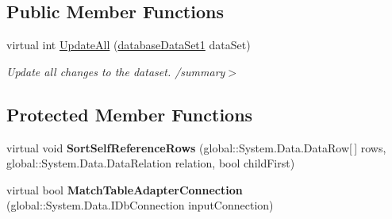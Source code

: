 \subsection*{Public Member Functions}
\begin{DoxyCompactItemize}
\item 
\mbox{\label{classprojekt__grupowy_1_1database_data_set1_table_adapters_1_1_table_adapter_manager_a38426ebb65e6233c6fd1842095acb234}} 
virtual int \hyperlink{classprojekt__grupowy_1_1database_data_set1_table_adapters_1_1_table_adapter_manager_a38426ebb65e6233c6fd1842095acb234}{Update\+All} (\hyperlink{classprojekt__grupowy_1_1database_data_set1}{database\+Data\+Set1} data\+Set)
\begin{DoxyCompactList}\small\item\em Update all changes to the dataset. /summary$>$ \end{DoxyCompactList}\end{DoxyCompactItemize}
\subsection*{Protected Member Functions}
\begin{DoxyCompactItemize}
\item 
\mbox{\label{classprojekt__grupowy_1_1database_data_set1_table_adapters_1_1_table_adapter_manager_a320d34e46e759b0a7f77e59ababa44d3}} 
virtual void {\bfseries Sort\+Self\+Reference\+Rows} (global\+::\+System.\+Data.\+Data\+Row\mbox{[}$\,$\mbox{]} rows, global\+::\+System.\+Data.\+Data\+Relation relation, bool child\+First)
\item 
\mbox{\label{classprojekt__grupowy_1_1database_data_set1_table_adapters_1_1_table_adapter_manager_ac8b01e5580545e7014c9ad25a99f87a6}} 
virtual bool {\bfseries Match\+Table\+Adapter\+Connection} (global\+::\+System.\+Data.\+I\+Db\+Connection input\+Connection)
\end{DoxyCompactItemize}
